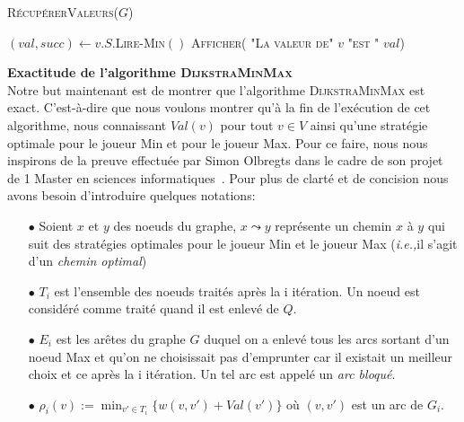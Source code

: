 \begin{algorithm}
	\caption{\textsc{RécupérerValeurs}($G$)}
	\label{algo:recupVal}
	\begin{algorithmic}[1]
	
		\STATE $(val,succ) \leftarrow v.S.$\textsc{Lire-Min}$()$
		\STATE \textsc{Afficher( "La valeur de" $v$ "est " $val$)}
	\ENDFOR
	
	
	\end{algorithmic}
\end{algorithm}


\FloatBarrier
	



\noindent\textbf{Exactitude de l'algorithme \textsc{DijkstraMinMax}}\\

Notre but maintenant est de montrer que l'algorithme \textsc{DijkstraMinMax} est exact. C'est-à-dire que nous voulons montrer qu'à la fin de l'exécution de cet algorithme, nous connaissant $Val(v)$ pour tout $v\in V$ ainsi qu'une stratégie optimale pour le joueur Min et pour le joueur Max.
Pour ce faire, nous nous inspirons de la preuve effectuée par Simon Olbregts dans le cadre de son projet de 1 Master en sciences informatiques~\cite{simon}. 
Pour plus de clarté et de concision nous avons besoin d'introduire quelques notations:\\

\begin{itemize}
	\item[$\bullet$] Soient $x$ et $y$ des noeuds du graphe, $x \leadsto y$ représente un chemin $x$ à $y$ qui suit des stratégies optimales pour le joueur Min et le joueur Max (\emph{i.e.,}il s'agit d'un \emph{chemin optimal})
	\item[$\bullet$] $T_{i}$ est l'ensemble des noeuds traités après la i itération. Un noeud est considéré comme traité quand il est enlevé de $Q$.
	\item[$\bullet$] $E_i$ est les arêtes du graphe $G$ duquel on a enlevé tous les arcs sortant d'un noeud Max et qu'on ne choisissait pas d'emprunter car il existait un meilleur choix et ce après la i itération. Un tel arc est appelé un \emph{arc bloqué}.
	\item[$\bullet$] $\rho_i(v) := \min _{v' \in T_i}\{ w(v,v') + Val(v') \} $ où $(v,v')$ est un arc de $G_i$.
\end{itemize}

